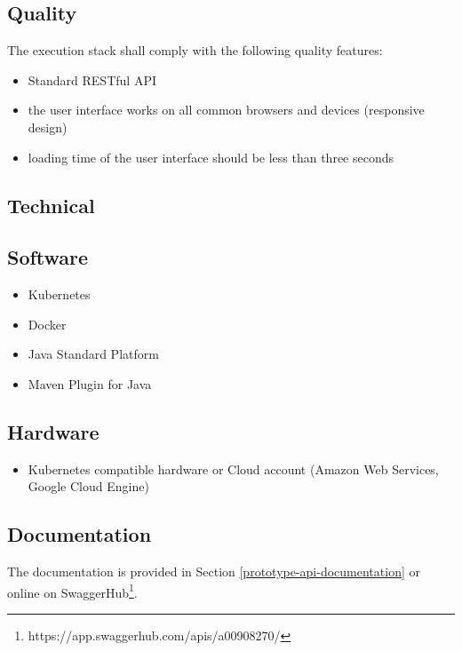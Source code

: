 \subsection{Quality}\label{quality}

The execution stack shall comply with the following quality features:

\begin{itemize}
\tightlist
\item
  Standard RESTful API
\item
  the user interface works on all common browsers and devices
  (responsive design)
\item
  loading time of the user interface should be less than three seconds
\end{itemize}

\subsection{Technical}\label{technical}

\subsection{Software}\label{software}

\begin{itemize}
\tightlist
\item
  Kubernetes
\item
  Docker
\item
  Java Standard Platform
\item
  Maven Plugin for Java
\end{itemize}

\subsection{Hardware}\label{hardware}

\begin{itemize}
\tightlist
\item
  Kubernetes compatible hardware or Cloud account (Amazon Web Services,
  Google Cloud Engine)
\end{itemize}

\subsection{Documentation}\label{documentation}

The documentation is provided in Section
\ref{prototype-api-documentation} or online on SwaggerHub\footnote{https://app.swaggerhub.com/apis/a00908270/}.

